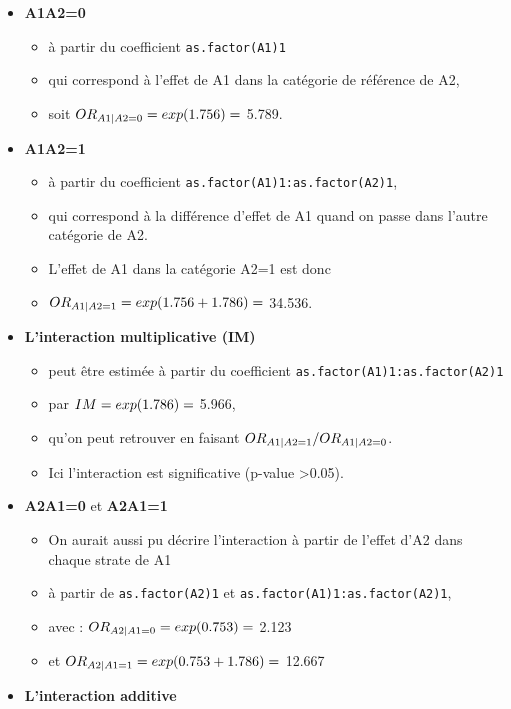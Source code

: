 \documentclass[
]{book}
\providecommand{\tightlist}{%
  \setlength{\itemsep}{0pt}\setlength{\parskip}{0pt}}
\begin{document}
\begin{itemize}
\tightlist
\item
  \textbf{A1\textbar A2=0}

  \begin{itemize}
  \tightlist
  \item
    à partir du coefficient \texttt{as.factor(A1)1}
  \item
    qui correspond à l'effet de A1 dans la catégorie de référence de A2,
  \item
    soit \(\small OR_{A1|A2=0} = exp(1.756) =\) 5.789.
  \end{itemize}
\item
  \textbf{A1\textbar A2=1}

  \begin{itemize}
  \tightlist
  \item
    à partir du coefficient \texttt{as.factor(A1)1:as.factor(A2)1},
  \item
    qui correspond à la différence d'effet de A1 quand on passe dans l'autre catégorie de A2.
  \item
    L'effet de A1 dans la catégorie A2=1 est donc
  \item
    \(\small OR_{A1|A2=1} = exp(1.756+1.786) =\) 34.536.
  \end{itemize}
\item
  \textbf{L'interaction multiplicative (IM)}

  \begin{itemize}
  \tightlist
  \item
    peut être estimée à partir du coefficient \texttt{as.factor(A1)1:as.factor(A2)1}
  \item
    par \(\small IM = exp(1.786) =\) 5.966,
  \item
    qu'on peut retrouver en faisant \(\small OR_{A1|A2=1}/ OR_{A1|A2=0}\).
  \item
    Ici l'interaction est significative (p-value \textgreater0.05).
  \end{itemize}
\item
  \textbf{A2\textbar A1=0} et \textbf{A2\textbar A1=1}

  \begin{itemize}
  \tightlist
  \item
    On aurait aussi pu décrire l'interaction à partir de l'effet d'A2 dans chaque strate de A1
  \item
    à partir de \texttt{as.factor(A2)1} et \texttt{as.factor(A1)1:as.factor(A2)1},
  \item
    avec : \(\small OR_{A2|A1=0} = exp(0.753) =\) 2.123
  \item
    et \(\small OR_{A2|A1=1} = exp(0.753+1.786) =\) 12.667
  \end{itemize}
\item
  \textbf{L'interaction additive}


\end{itemize}
\end{document}
